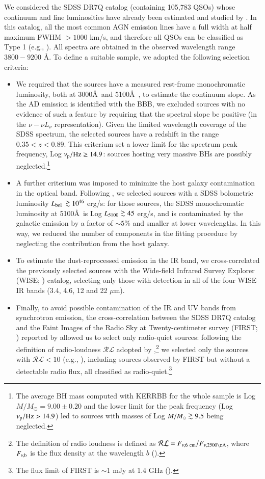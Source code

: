 \documentclass[]{aa}
\def\spose#1{\hbox to 0pt{#1\hss}}
\newcommand\gsim{\mathrel{\spose{\lower 3pt\hbox{$\mathchar"218$}}
     \raise 2.0pt\hbox{$\mathchar"13E$}}}
\begin{document}
We considered the SDSS DR7Q catalog (containing 105,783 QSOs) whose continuum and line luminosities have already been estimated and studied by \citet{Shenetal11}. In this catalog, all the most common AGN emission lines have a full width at half maximum FWHM $>1000$ km/s, and therefore all QSOs can be classified as Type 1 (e.g., \citealt{Anto}). All spectra are obtained in the observed wavelength range $3800-9200$ \AA. To define a suitable sample, we adopted the following selection criteria:
\begin{itemize}
	\item We required that the sources have a measured rest-frame monochromatic luminosity, both at 3000\AA\ and 5100\AA\ , to estimate the continuum slope. As the AD emission is identified with the BBB, we excluded sources with no evidence of such a feature by requiring that the spectral slope be positive (in the $\nu - \nu L_{\nu}$ representation). Given the limited wavelength coverage of the SDSS spectrum, the selected sources have a redshift in the range $0.35 < z < 0.89$. This criterium set a lower limit for the spectrum peak frequency, Log $\nu_{\rm p} / {\rm Hz} \geq 14.9$: sources hosting very massive BHs are possibly neglected.\footnote{The average BH mass computed with KERRBB for the whole sample is Log $M / M_{\odot} = 9.00 \pm 0.20$ and the lower limit for the peak frequency (Log $\nu_{\rm p}/ {\rm Hz} > 14.9$) led to sources with masses of Log $M / M_{\odot} \gsim 9.5$ being neglected.}
	\item A further criterium was imposed to minimize the host galaxy contamination in the optical band. Following \citet{Shenetal11}, we selected sources with a SDSS bolometric luminosity $L_{\rm bol}$ $\gsim 10^{46}$ erg/s: for those sources, the SDSS monochromatic luminosity at 5100\AA\ is Log $L_{5100} \gsim 45$ erg/s, and is contaminated by the galactic emission by a factor of $\sim 5 \%$ and smaller at lower wavelengths. In this way, we reduced the number of components in the fitting procedure by neglecting the contribution from the host galaxy.
	\item To estimate the dust-reprocessed emission in the IR band, we cross-correlated the previously selected sources with the Wide-field Infrared Survey Explorer (WISE; \citealt{Wright}) catalog, selecting only those with detection in all of the four WISE IR bands (3.4, 4.6, 12 and 22 $\mu$m). 
	\item Finally, to avoid possible contamination of the IR and UV bands from synchrotron emission, the cross-correlation between the SDSS DR7Q catalog and the Faint Images of the Radio Sky at Twenty-centimeter survey (FIRST; \citealt{Becker}) reported by \citet{Shenetal11} allowed us to select only radio-quiet sources: following the definition of radio-loudness $\mathcal{R L}$ adopted by \citet{Shenetal11},\footnote{The definition of radio loudness is defined as $\mathcal{R L} = F_{\nu, {\rm 6\ cm}} / F_{\nu, 2500{\rm \AA}}$, where $F_{\nu, {\rm b}}$ is the flux density at the wavelength $b$ (\citealt{Shenetal11}).} we selected only the sources with $\mathcal{R L} < 10$ (e.g., \citealt{Keller}), including sources observed by FIRST but without a detectable radio flux, all classified as radio-quiet.\footnote{The flux limit of FIRST is $\sim$1 mJy at 1.4 GHz (\citealt{Becker}).}

\end{itemize}
\end{document}
